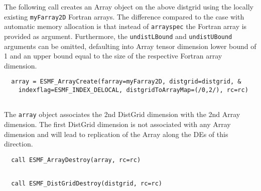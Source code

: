   The following call creates an Array object on the above distgrid using
   the locally existing {\tt myFarray2D} Fortran arrays. The difference 
   compared to the case with automatic memory allocation is that instead of
   {\tt arrayspec} the Fortran array is provided as argument. Furthermore,
   the {\tt undistLBound} and {\tt undistUBound} arguments can be omitted,
   defaulting into Array tensor dimension lower bound of 1 and an upper
   bound equal to the size of the respective Fortran array dimension. 

 \begin{verbatim}
  array = ESMF_ArrayCreate(farray=myFarray2D, distgrid=distgrid, &
    indexflag=ESMF_INDEX_DELOCAL, distgridToArrayMap=(/0,2/), rc=rc)
 
\end{verbatim}
 

   The {\tt array} object associates the 2nd DistGrid dimension with the 2nd
   Array dimension. The first DistGrid dimension is not associated with any
   Array dimension and will lead to replication of the Array along the DEs of
   this direction. 

 \begin{verbatim}
  call ESMF_ArrayDestroy(array, rc=rc)
 
\end{verbatim}
 

 \begin{verbatim}
  call ESMF_DistGridDestroy(distgrid, rc=rc)
 
\end{verbatim}

\setlength{\parskip}{\oldparskip}
\setlength{\parindent}{\oldparindent}
\setlength{\baselineskip}{\oldbaselineskip}

